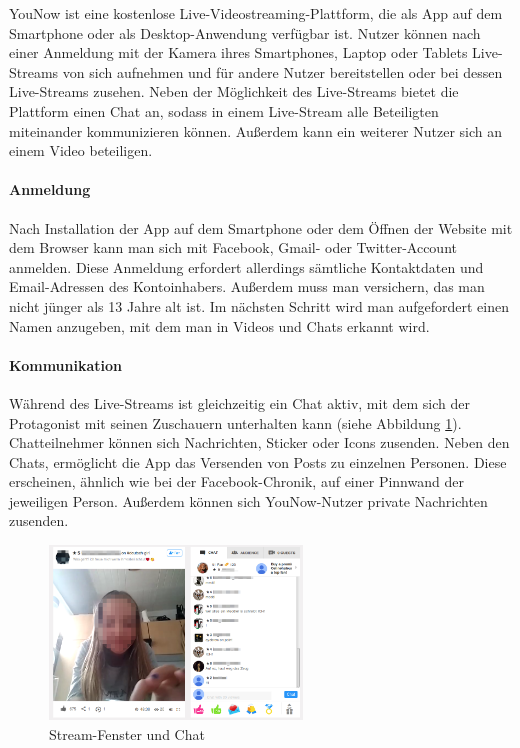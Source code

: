 YouNow ist eine kostenlose Live-Videostreaming-Plattform, die als App auf dem Smartphone oder als Desktop-Anwendung verfügbar ist. Nutzer können nach einer Anmeldung mit der Kamera ihres Smartphones, Laptop oder Tablets Live-Streams von sich aufnehmen und für andere Nutzer bereitstellen oder bei dessen Live-Streams zusehen. Neben der Möglichkeit des Live-Streams bietet die Plattform einen Chat an, sodass in einem Live-Stream alle Beteiligten miteinander kommunizieren können. Außerdem kann ein weiterer Nutzer sich an einem Video beteiligen. 

\paragraph{Anmeldung}
Nach Installation der App auf dem Smartphone oder dem Öffnen der Website mit dem Browser kann man sich mit Facebook, Gmail- oder Twitter-Account anmelden. Diese Anmeldung erfordert allerdings sämtliche Kontaktdaten und Email-Adressen des Kontoinhabers. Außerdem muss man versichern, das man nicht jünger als 13 Jahre alt ist.
Im nächsten Schritt wird man aufgefordert einen Namen anzugeben, mit dem man in Videos und Chats erkannt wird.

\paragraph{Kommunikation}
Während des Live-Streams ist gleichzeitig ein Chat aktiv, mit dem sich der Protagonist mit seinen Zuschauern unterhalten kann (siehe Abbildung \ref{stream_with_chat}). Chatteilnehmer können sich Nachrichten, Sticker oder Icons zusenden. Neben den Chats, ermöglicht die App das Versenden von Posts zu einzelnen Personen. Diese erscheinen, ähnlich wie bei der Facebook-Chronik, auf einer Pinnwand der jeweiligen Person. Außerdem können sich YouNow-Nutzer private Nachrichten zusenden.

\begin{figure}[!ht]
\centering
\includegraphics[width=0.6\textwidth]{./resources/younow_stream_with_chat}
\caption{Stream-Fenster und Chat}
\label{stream_with_chat}
\end{figure} 

